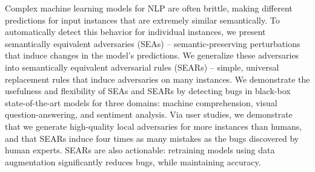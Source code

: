 Complex machine learning models for NLP are often brittle, making different predictions for input instances that are extremely similar semantically. To automatically detect this behavior for individual instances, we present semantically equivalent adversaries (SEAs) -- semantic-preserving perturbations that induce changes in the model's predictions. We generalize these adversaries into semantically equivalent adversarial rules (SEARs) -- simple, universal replacement rules that induce adversaries on many instances. We demonstrate the usefulness and flexibility of SEAs and SEARs by detecting bugs in black-box state-of-the-art models for three domains: machine comprehension, visual question-answering, and sentiment analysis. Via user studies, we demonstrate that we generate high-quality local adversaries for more instances than humans, and that SEARs induce four times as many mistakes as the bugs discovered by human experts. SEARs are also actionable: retraining models using data augmentation significantly reduces bugs, while maintaining accuracy.

